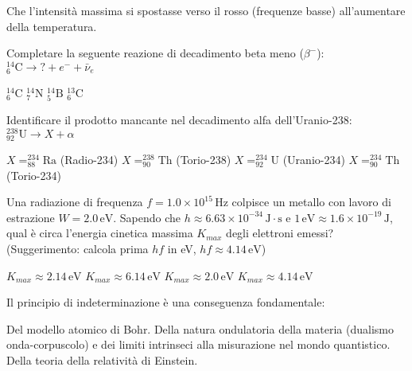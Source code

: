 \documentclass{exam}%
\begin{document}
\begin{questions}
\begin{choices}
\choice Che l'intensità massima si spostasse verso il rosso (frequenze basse) all'aumentare della temperatura.%
\end{choices}%
\question Completare la seguente reazione di decadimento beta meno ($\beta^-$): $^{14}_{6}\text{C} \rightarrow ? + e^- + \bar{\nu}_e$%
\vspace{0.2em}%
\begin{multicols}{4}%
\begin{choices}%
\choice $^{14}_{6}\text{C}$%
\choice $^{14}_{7}\text{N}$%
\choice $^{14}_{5}\text{B}$%
\choice $^{13}_{6}\text{C}$%
\end{choices}%
\end{multicols}%
\question Identificare il prodotto mancante nel decadimento alfa dell'Uranio-238: $^{238}_{92}\text{U} \rightarrow X + \alpha$%
\vspace{0.2em}%
\begin{multicols}{4}%
\begin{choices}%
\choice $X = ^{234}_{88}\text{Ra}$ (Radio-234)%
\choice $X = ^{238}_{90}\text{Th}$ (Torio-238)%
\choice $X = ^{234}_{92}\text{U}$ (Uranio-234)%
\choice $X = ^{234}_{90}\text{Th}$ (Torio-234)%
\end{choices}%
\end{multicols}%
\question Una radiazione di frequenza $f = 1.0 \times 10^{15} \, \text{Hz}$ colpisce un metallo con lavoro di estrazione $W = 2.0 \, \text{eV}$. Sapendo che $h \approx 6.63 \times 10^{-34} \, \text{J} \cdot \text{s}$ e $1 \, \text{eV} \approx 1.6 \times 10^{-19} \, \text{J}$, qual è circa l'energia cinetica massima $K_{max}$ degli elettroni emessi? (Suggerimento: calcola prima $hf$ in eV, $hf \approx 4.14 \, \text{eV}$)%
\vspace{0.2em}%
\begin{multicols}{4}%
\begin{choices}%
\choice $K_{max} \approx 2.14 \, \text{eV}$%
\choice $K_{max} \approx 6.14 \, \text{eV}$%
\choice $K_{max} \approx 2.0 \, \text{eV}$%
\choice $K_{max} \approx 4.14 \, \text{eV}$%
\end{choices}%
\end{multicols}%
\question Il principio di indeterminazione è una conseguenza fondamentale:%
\vspace{0.2em}%
\begin{choices}%
\choice Del modello atomico di Bohr.%
\choice Della natura ondulatoria della materia (dualismo onda-corpuscolo) e dei limiti intrinseci alla misurazione nel mondo quantistico.%
\choice Della teoria della relatività di Einstein.%

\end{choices}
\end{questions}
\end{document}
